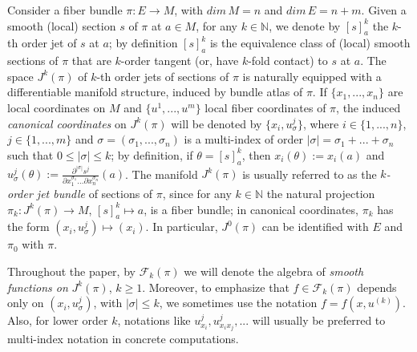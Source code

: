 \documentclass[12pt,english]{elsarticle}
\theoremstyle{plain}
\theoremstyle{plain}
\theoremstyle{remark}
\theoremstyle{plain}
\theoremstyle{definition}
\theoremstyle{definition}
\begin{document}
Consider a fiber bundle $\pi :E\rightarrow M$, with $dim\,M=n$ and
$dim\,E=n+m$. Given a smooth (local) section $s$ of $\pi $ at
$a\in M$, for any $k\in \mathbb{N}$, we denote by $[s]_{a}^{k}$ the
$k$-th order jet of $s$ at $a$; by definition $[s]_{a}^{k}$ is the equivalence
class of (local) smooth sections of $\pi $ that are $k$-order tangent (or,
have $k$-fold contact) to $s$ at $a$. The space $J^{k}(\pi )$ of $k$-th
order jets of sections of $\pi $ is naturally equipped with a differentiable
manifold structure, induced by bundle atlas of $\pi $. If
$\{x_{1},...,x_{n}\}$ are local coordinates on $M$ and
$\{u^{1},...,u^{m}\}$ local fiber coordinates of $\pi $, the induced
\textit{canonical coordinates} on $J^{k}(\pi )$ will be denoted by
$\{x_{i},u_{\sigma}^{j}\}$, where $i\in \{1,...,n\}$,
$j\in \{1,...,m\}$ and $\sigma =(\sigma _{1},...,\sigma _{n})$ is a multi-index
of order $|\sigma |=\sigma _{1}+...+\sigma _{n}$ such that
$0\leq |\sigma |\leq k$; by definition, if $\theta =[s]_{a}^{k}$, then
$x_{i}(\theta ):=x_{i}(a)$ and
$u_{\sigma}^{j}(\theta ):=
\frac{\partial ^{|\sigma |}s^{j}}{\partial x_{1}^{\sigma _{1}}...\partial x_{n}^{\sigma _{n}}}(a)$.
The manifold $J^{k}(\pi )$ is usually referred to as the $k$\textit{-order
jet bundle} of sections of $\pi $, since for any $k\in \mathbb{N}$ the
natural projection $\pi _{k}:J^{k}(\pi )\rightarrow M$,
$[s]_{a}^{k}\mapsto a$, is a fiber bundle; in canonical coordinates,
$\pi _{k}$ has the form $(x_{i},u_{\sigma}^{j})\mapsto (x_{i})$. In particular,
$J^{0}(\pi )$ can be identified with $E$ and $\pi _{0}$ with $\pi $.

Throughout the paper, by $\mathcal{F}_{k}(\pi )$ we will denote the algebra
of \textit{smooth functions on} $J^{k}(\pi )$, $k\geq 1$. Moreover, to emphasize
that $f\in \mathcal{F}_{k}(\pi )$ depends only on
$(x_{i},u_{\sigma}^{j})$, with $|\sigma |\leq k$, we sometimes use the
notation $f=f(x,u^{(k)})$. Also, for lower order $k$, notations like
$u_{x_{i}}^{j},u_{x_{i}x_{j}}^{j},...$ will usually be preferred to multi-index
notation in concrete computations.
\end{document}
